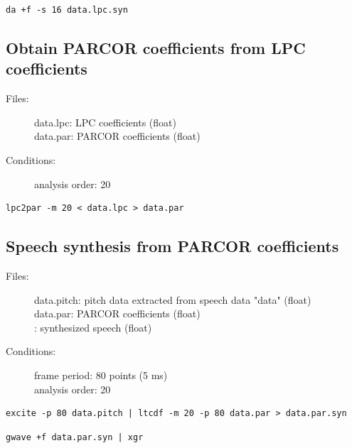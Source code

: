 \documentclass[a4paper,10pt]{article}
\begin{document}
\begin{verbatim}
da +f -s 16 data.lpc.syn
\end{verbatim}

\subsection{Obtain PARCOR coefficients from LPC coefficients}

\begin{description}
\item[Files:] 
   data.lpc: LPC coefficients (float)\\
   data.par: PARCOR coefficients (float)
\item[Conditions:]
  analysis order: 20
\end{description}

\begin{verbatim}
lpc2par -m 20 < data.lpc > data.par
\end{verbatim}

\subsection{Speech synthesis from PARCOR coefficients}
\begin{description}
\item[Files:]
  data.pitch: pitch data extracted from speech data "data" (float)\\
  data.par: PARCOR coefficients (float)\\
  :
  synthesized speech (float)
\item[Conditions:]
  frame period: 80 points (5 ms)\\
  analysis order: 20
\end{description}

\begin{verbatim}
excite -p 80 data.pitch | ltcdf -m 20 -p 80 data.par > data.par.syn
\end{verbatim}

\begin{verbatim}
gwave +f data.par.syn | xgr
\end{verbatim}
\end{document}
